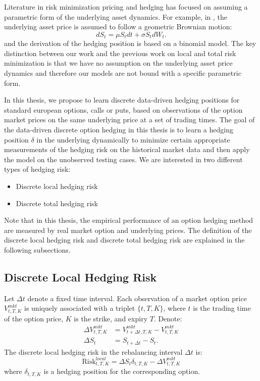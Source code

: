 \documentclass[letterpaper,12pt,titlepage,oneside,final]{book}
\numberwithin{equation}{section}
\theoremstyle{definition}
\newcommand{\DT}{\Delta t}
\newcommand{\Vmkt}{V^{mkt}}
\newcommand{\Smkt}{S}
\begin{document}
Literature in risk minimization pricing and hedging has focused on assuming a parametric form of the underlying asset dynamics. For example, in \cite{coleman2003discrete,coleman2007discrete}, the underlying asset price is assumed to follow  a geometric Brownian motion:
\[
dS_t=\mu S_t dt+\sigma S_t dW_t.
\]
and the derivation of the hedging position is based on a binomial model. The key distinction between our work and  the previous work on local and total risk minimization is that we have no assumption on the underlying asset price dynamics and therefore our models are not bound with a specific parametric form.

In this thesis, we propose to learn discrete data-driven hedging positions for standard european options, calls or puts, based on observations of the option market prices on the same underlying price at a set of trading times. The goal of the data-driven discrete option hedging in this thesis is to learn a hedging position $\delta$ in the underlying dynamically to minimize certain appropriate measurements of the hedging risk on the historical market data and then apply the model on the unobserved testing cases. We are interested in two different types of hedging risk:
\begin{itemize}
   \item  Discrete local hedging risk
   \item  Discrete total hedging risk
\end{itemize}
Note that in this thesis, the  empirical performance of an option hedging method are measured by real market option and underlying prices.
The definition of the discrete local hedging risk and discrete total hedging risk are explained in the following subsections. 

\subsection{Discrete Local Hedging Risk}
\label{sec:DiscreteLocalRisk}
 Let $\DT$ denote a fixed  time interval.
Each observation of a market option price  $V^{mkt}_{t,T,K}$ is uniquely associated with a triplet $\{t,T,K\}$, where $t$ is the trading time of the option price,  $K$ is the strike, and expiry $T$.
  Denote:
\begin{equation}
\begin{split}
\Delta V^{mkt}_{t,T,K}& =\Vmkt_{t+\Delta t,T,K}-\Vmkt_{t,T,K}\\
\Delta \Smkt_{t} &=\Smkt_{t+\DT}-\Smkt_{t}.
\end{split}
\label{eq:DVDS}
\end{equation}
The discrete local hedging risk in the rebalancing interval $\DT$ is:
\begin{equation}
	\text{Risk}^{local}_{t,T,K}=\Delta \Smkt_{t}\delta_{t,T,K} -\Delta V^{mkt}_{t,T,K}
\label{eq:local}
\end{equation}
where $\delta_{t,T,K}$ is a hedging position for the corresponding option.
\end{document}

